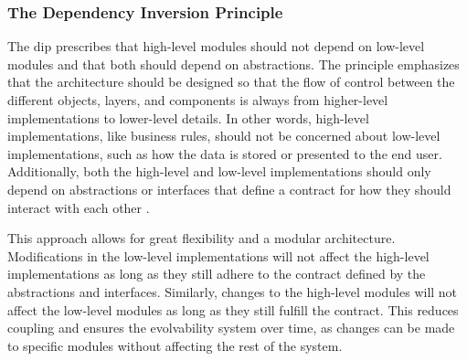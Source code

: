 \subsubsection{The Dependency Inversion Principle} \label{subsubsec_dip} 

The \gls{dip} prescribes that high-level modules should not depend on low-level modules
and that both should depend on abstractions. The principle emphasizes that the
architecture should be designed so that the flow of control between the different objects,
layers, and components is always from higher-level implementations to lower-level details.
In other words, high-level implementations, like business rules, should not be concerned
about low-level implementations, such as how the data is stored or presented to the end
user. Additionally, both the high-level and low-level implementations should only depend
on abstractions or interfaces that define a contract for how they should interact with
each other \parencite[91]{robert_c_martin_clean_2018}. 

This approach allows for great flexibility and a modular architecture. Modifications in
the low-level implementations will not affect the high-level implementations as long as
they still adhere to the contract defined by the abstractions and interfaces. Similarly,
changes to the high-level modules will not affect the low-level modules as long as they
still fulfill the contract. This reduces coupling and ensures the evolvability system over
time, as changes can be made to specific modules without affecting the rest of the system.